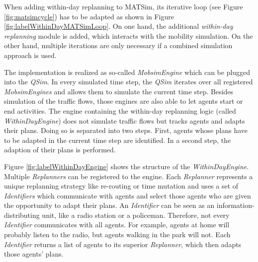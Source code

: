 
When adding within-day replanning to MATSim, its iterative loop (see Figure \ref{fig:matsimcycle}) has to be adapted as shown in Figure \ref{fig:labelWithinDayMATSimLoop}. On one hand, the additional \emph{within-day replanning} module is added, which interacts with the mobility simulation. On the other hand, multiple iterations are only necessary if a combined simulation approach is used.


The implementation is realized as so-called \emph{MobsimEngine} which can be plugged into the \emph{QSim}. In every simulated time step, the \emph{QSim} iterates over all registered \emph{MobsimEngines} and allows them to simulate the current time step. Besides simulation of the traffic flows, those engines are also able to let agents start or end activities. The engine containing the within-day replanning logic (called \emph{WithinDayEngine}) does not simulate traffic flows but tracks agents and adapts their plans. Doing so is separated into two steps. First, agents whose plans have to be adapted in the current time step are identified. In a second step, the adaption of their plans is performed. 


Figure \ref{fig:labelWithinDayEngine} shows the structure of the \emph{WithinDayEngine}. Multiple \emph{Replanners} can be registered to the engine. Each \emph{Replanner} represents a unique replanning strategy like re-routing or time mutation and uses a set of \emph{Identifiers} which communicate with agents and select those agents who are given the opportunity to adapt their plans. An \emph{Identifier} can be seen as an information-distributing unit, like a radio station or a policeman. Therefore, not every \emph{Identifier} communicates with all agents. For example, agents at home will probably listen to the radio, but agents walking in the park will not. Each \emph{Identifier} returns a list of agents to its superior \emph{Replanner}, which then adapts those agents' plans.

